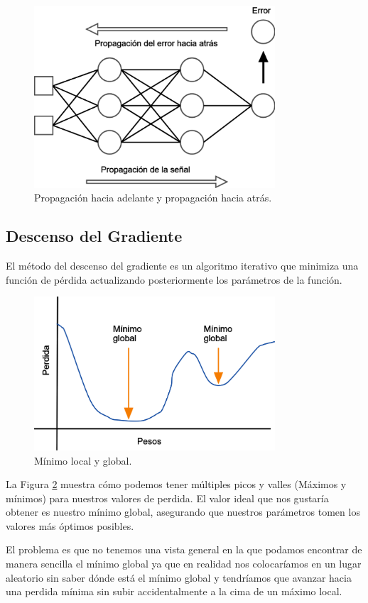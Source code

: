 \begin{figure}[H]
    \centering
    \includegraphics[width=0.8\textwidth]{MarcoTeorico/imgs/Backpropagation.png}
    \caption{Propagación hacia adelante y propagación hacia atrás.}
    \label{fig:backpropagation}
\end{figure}

\subsection{Descenso del Gradiente }

El método del descenso del gradiente es un algoritmo iterativo que minimiza una función de pérdida actualizando posteriormente los parámetros de la función.

\begin{figure}[H]
    \centering
    \includegraphics[width=0.8\textwidth]{MarcoTeorico/imgs/DescensoGradiente.png}
    \caption{Mínimo local y global.}
    \label{fig:descensoGradiente}
\end{figure}

La Figura \ref{fig:descensoGradiente} muestra cómo podemos tener múltiples picos y valles (Máximos y mínimos) para nuestros valores de perdida. El valor ideal que nos gustaría obtener es nuestro mínimo global, asegurando que nuestros parámetros tomen los valores más óptimos posibles.

El problema es que no tenemos una vista general en la que podamos encontrar de manera sencilla el mínimo global ya que en realidad nos colocaríamos en un lugar aleatorio sin saber dónde está el mínimo global y tendríamos que avanzar hacia una perdida mínima sin subir accidentalmente a la cima de un máximo local.
